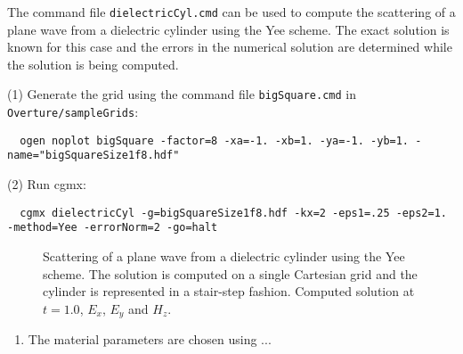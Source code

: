 The command file {\tt dielectricCyl.cmd} can be used to compute the scattering
of a plane wave from a dielectric cylinder using the Yee scheme. The exact solution is known for this case
and the errors in the numerical solution are determined while the solution
is being computed.


\noindent (1) Generate the grid using the command file {\tt bigSquare.cmd} in {\tt Overture/sampleGrids}:
{\small
\begin{verbatim}
  ogen noplot bigSquare -factor=8 -xa=-1. -xb=1. -ya=-1. -yb=1. -name="bigSquareSize1f8.hdf"
\end{verbatim}
}
\noindent (2) Run cgmx: 
\begin{verbatim}
  cgmx dielectricCyl -g=bigSquareSize1f8.hdf -kx=2 -eps1=.25 -eps2=1. -method=Yee -errorNorm=2 -go=halt
\end{verbatim}

{
\begin{figure}[hbt]
\newcommand{\figWidth}{5.5cm}
\newcommand{\trimfig}[2]{\trimFig{#1}{#2}{0.1}{0.05}{.05}{.05}}
\begin{center}
\end{center}
\caption{Scattering of a plane wave from a dielectric cylinder using the Yee scheme. The solution is
computed on a single Cartesian grid and the cylinder is represented in a stair-step fashion. 
Computed solution at $t=1.0$, $E_x$, $E_y$ and $H_z$.}
\label{fig:cyl2dDielectricScatYee}
\end{figure}
}

\begin{enumerate}
  \item The material parameters are chosen using ...
\end{enumerate}



